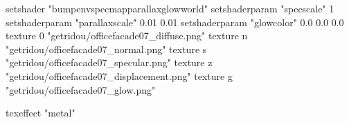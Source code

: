 setshader "bumpenvspecmapparallaxglowworld"
setshaderparam "specscale" 1
setshaderparam "parallaxscale" 0.01 0.01
setshaderparam "glowcolor" 0.0 0.0 0.0
texture 0 "getridou/officefacade07_diffuse.png"
texture n "getridou/officefacade07_normal.png"
texture s "getridou/officefacade07_specular.png"
texture z "getridou/officefacade07_displacement.png"
texture g "getridou/officefacade07_glow.png"

texeffect "metal"
